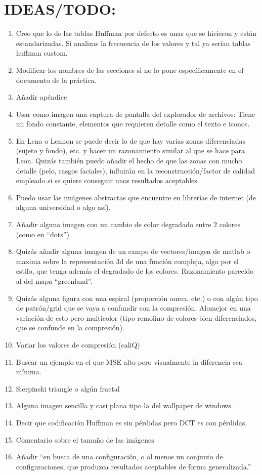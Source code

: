 \documentclass[12pt,a4paper]{article}
\begin{document}
\newpage
\section*{IDEAS/TODO:}
\begin{enumerate}
    \item Creo que lo de las tablas Huffman por defecto es unas que se hicieron y están estandarizadas. Si analizas la frecuencia de los valores y tal ya serían tablas huffman custom.
    \item Modificar los nombres de las secciones si no lo pone específicamente en el documento de la práctica.
    \item Añadir apéndice
    \item Usar como imagen una captura de pantalla del explorador de archivos: Tiene un fondo constante, elementos que requieren detalle como el texto e iconos.
    \item En Lena o Lennon se puede decir lo de que hay varias zonas diferenciadas (sujeto y fondo), etc. y hacer un razonamiento similar al que se hace para Leon. Quizás también puedo añadir el hecho de que las zonas con mucho detalle (pelo, rasgos faciales), influirán en la reconstrucción/factor de calidad empleado si se quiere conseguir unos resultados aceptables. 
    \item Puedo usar las imágenes abstractas que encuentre en librerías de internet (de alguna universidad o algo así).
    \item Añadir alguna imagen con un cambio de color degradado entre 2 colores (como en ``dots'').
    \item Quizás añadir alguna imagen de un campo de vectores/imagen de matlab o maxima sobre la representación 3d de una función compleja, algo por el estilo, que tenga además el degradado de los colores. Razonamiento parecido al del mapa ``greenland''.
    \item Quizás alguna figura con una espiral (proporción aurea, etc.) o con algún tipo de patrón/grid que se vaya a confundir con la compresión. Alomejor en una variación de esto pero multicolor (tipo remolino de colores bien diferenciados, que se confunde en la compresión).
    \item Variar los valores de compresión (caliQ)
    \item Buscar un ejemplo en el que MSE alto pero visualmente la diferencia sea mínima.
    \item Sierpinski triangle o algún fractal
    \item Alguna imagen sencilla y casi plana tipo la del wallpaper de windows.
    \item Decir que codificación Huffman es sin pérdidas pero DCT es con pérdidas.
    \item Comentario sobre el tamaño de las imágenes
    \item Añadir ``en busca de una configuración, o al menos un conjunto de configuraciones, que produzca resultados aceptables de forma generalizada.''
\end{enumerate}


\newpage
\nocite{*}
\printbibliography
\end{document}
